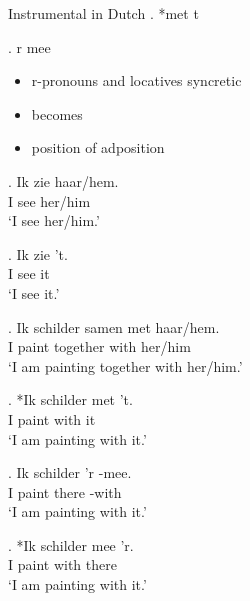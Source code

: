 \documentclass[xcolor=dvipsnames,10pt]{beamer}
\begin{document}
\begin{frame}

Instrumental in Dutch
\ex. *met t

\ex. r mee

\pause

\begin{itemize}
	\item r-pronouns and locatives syncretic \pause
	\item {} becomes  \pause
	\item position of adposition
\end{itemize}

\end{frame}



\begin{frame}

\exg. Ik zie haar/hem.\\
 I see her/him\\
 `I see her/him.'\label{ex:aniobj}

\exg. Ik zie 't.\\
 I see it\\
 `I see it.'\label{ex:inaniobj}

\end{frame}


\begin{frame}

\exg. Ik schilder samen met haar/hem.\\
 I paint together with her/him\\
 `I am painting together with her/him.'\label{ex:prepani}

\exg. *Ik schilder met 't.\\
 I paint with it\\
 `I am painting with it.'\label{ex:prephet}

\exg. Ik schilder 'r -mee.\\
 I paint there -with\\
 `I am painting with it.'\label{ex:preper}

\exg. *Ik schilder mee 'r.\\
 I paint with there\\
 `I am painting with it.'\label{ex:erprep}

\end{frame}
\end{document}
